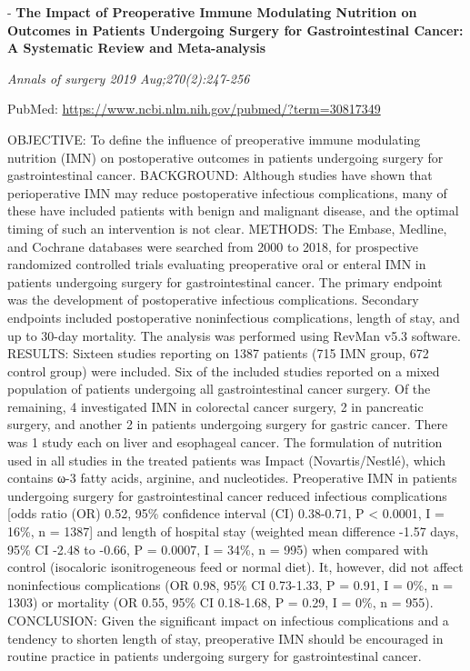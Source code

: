 \documentclass[]{article}
\begin{document}
 - \textbf{The Impact of Preoperative Immune Modulating Nutrition on
Outcomes in Patients Undergoing Surgery for Gastrointestinal Cancer: A
Systematic Review and Meta-analysis}

\emph{Annals of surgery 2019 Aug;270(2):247-256}

PubMed: \url{https://www.ncbi.nlm.nih.gov/pubmed/?term=30817349}

OBJECTIVE: To define the influence of preoperative immune modulating
nutrition (IMN) on postoperative outcomes in patients undergoing surgery
for gastrointestinal cancer. BACKGROUND: Although studies have shown
that perioperative IMN may reduce postoperative infectious
complications, many of these have included patients with benign and
malignant disease, and the optimal timing of such an intervention is not
clear. METHODS: The Embase, Medline, and Cochrane databases were
searched from 2000 to 2018, for prospective randomized controlled trials
evaluating preoperative oral or enteral IMN in patients undergoing
surgery for gastrointestinal cancer. The primary endpoint was the
development of postoperative infectious complications. Secondary
endpoints included postoperative noninfectious complications, length of
stay, and up to 30-day mortality. The analysis was performed using
RevMan v5.3 software. RESULTS: Sixteen studies reporting on 1387
patients (715 IMN group, 672 control group) were included. Six of the
included studies reported on a mixed population of patients undergoing
all gastrointestinal cancer surgery. Of the remaining, 4 investigated
IMN in colorectal cancer surgery, 2 in pancreatic surgery, and another 2
in patients undergoing surgery for gastric cancer. There was 1 study
each on liver and esophageal cancer. The formulation of nutrition used
in all studies in the treated patients was Impact (Novartis/Nestlé),
which contains ω-3 fatty acids, arginine, and nucleotides. Preoperative
IMN in patients undergoing surgery for gastrointestinal cancer reduced
infectious complications {[}odds ratio (OR) 0.52, 95\% confidence
interval (CI) 0.38-0.71, P \textless{} 0.0001, I = 16\%, n = 1387{]} and
length of hospital stay (weighted mean difference -1.57 days, 95\% CI
-2.48 to -0.66, P = 0.0007, I = 34\%, n = 995) when compared with
control (isocaloric isonitrogeneous feed or normal diet). It, however,
did not affect noninfectious complications (OR 0.98, 95\% CI 0.73-1.33,
P = 0.91, I = 0\%, n = 1303) or mortality (OR 0.55, 95\% CI 0.18-1.68, P
= 0.29, I = 0\%, n = 955). CONCLUSION: Given the significant impact on
infectious complications and a tendency to shorten length of stay,
preoperative IMN should be encouraged in routine practice in patients
undergoing surgery for gastrointestinal cancer.
\end{document}
